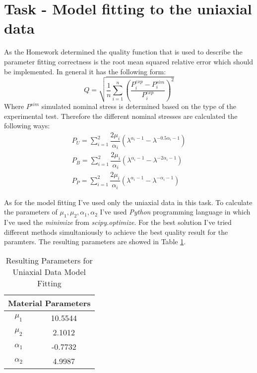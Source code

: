 \documentclass[12pt]{article}
\begin{document}
\section{Task - Model fitting to the uniaxial data}
As the Homework determined the quality function that is used to describe the parameter fitting correctness is the root mean squared relative error which should be implemented. In general it has the following form:
\begin{equation}
  Q = \sqrt{\dfrac{1}{n} \sum_{i=1}^{n} \left( \dfrac{P_i^{exp} - P_i^{sim}}{P_i^{exp}}\right) ^2 }
\end{equation}
Where $P^{sim}$ simulated nominal stress is determined based on the type of the experimental test. Therefore the different nominal stresses are calculated the following ways:
\begin{gather}
  P_U = \sum_{i=1}^{2} \dfrac{2\mu_i}{\alpha_i} \left( \lambda^{\alpha_i - 1} - \lambda ^{-0.5\alpha_i-1}  \right) \\
  P_B = \sum_{i=1}^{2} \dfrac{2\mu_i}{\alpha_i} \left( \lambda^{\alpha_i - 1} - \lambda ^{-2\alpha_i-1}  \right) \\
  P_P = \sum_{i=1}^{2} \dfrac{2\mu_i}{\alpha_i} \left( \lambda^{\alpha_i - 1} - \lambda ^{-\alpha_i-1}  \right)
\end{gather}

\noindent As for the model fitting I've used only the uniaxial data in this task. To calculate the parameters of $\mu_1, \mu_2, \alpha_1, \alpha_2$ I've used \textit{Python} programming language in which I've used the \textit{minimize} from \textit{scipy.optimize}. For the best solution I've tried different methods simultaniously to achieve the best quality result for the paramters. The resulting parameters are showed in Table \ref{tab:quality_results_01}.

\begin{table}[htbp]
  \centering
  \caption{Resulting Parameters for Uniaxial Data Model Fitting}
  \label{tab:quality_results_01}
  \begin{tabular}{cc}
      \multicolumn{2}{c}{\textbf{Material Parameters}} \\ \hline
      $\mu_1$ & 10.5544 \\
      $\mu_2$ & 2.1012 \\
      $\alpha_1$ & -0.7732 \\
      $\alpha_2$ & 4.9987 \\
  \end{tabular}
\end{table}
\end{document}
